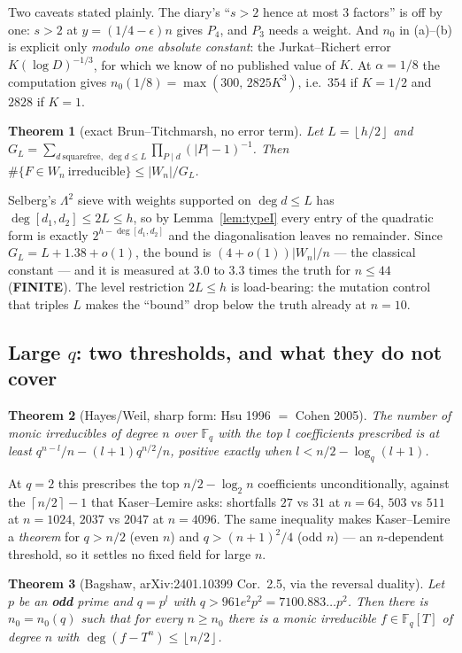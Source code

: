 \documentclass[10pt]{article}
\theoremstyle{plain}
\newtheorem{theorem}{Theorem}[section]
\theoremstyle{definition}
\newcommand{\F}{\mathbb F}
\newcommand{\ceil}[1]{\left\lceil #1\right\rceil}
\newcommand{\flr}[1]{\left\lfloor #1\right\rfloor}
\newcommand{\finite}{\textcolor{finite}{\textsf{\textbf{\footnotesize FINITE}}}}
\begin{document}
Two caveats stated plainly. The diary's ``$s>2$ hence at most $3$ factors'' is
off by one: $s>2$ at $y=(1/4-\epsilon)n$ gives $P_4$, and $P_3$ needs a weight.
And $n_0$ in (a)--(b) is explicit only \emph{modulo one absolute constant}: the
Jurkat--Richert error $K(\log D)^{-1/3}$, for which we know of no published
value of $K$. At $\alpha=1/8$ the computation gives
$n_0(1/8)=\max(300,\,2825K^3)$, i.e.\ $354$ if $K=1/2$ and $2828$ if $K=1$.

\begin{theorem}[exact Brun--Titchmarsh, no error term]\label{thm:BT}
Let $L=\flr{h/2}$ and
$G_L=\sum_{d\ \mathrm{squarefree},\ \deg d\le L}\prod_{P\mid d}(|P|-1)^{-1}$.
Then $\#\{F\in W_n\ \mathrm{irreducible}\}\le|W_n|/G_L$.
\end{theorem}

Selberg's $\Lambda^2$ sieve with weights supported on $\deg d\le L$ has
$\deg[d_1,d_2]\le2L\le h$, so by Lemma~\ref{lem:typeI} every entry of the
quadratic form is exactly $2^{h-\deg[d_1,d_2]}$ and the diagonalisation
leaves no remainder. Since $G_L=L+1.38+o(1)$, the bound is
$(4+o(1))|W_n|/n$ --- the classical constant --- and it is measured at
$3.0$ to $3.3$ times the truth for $n\le44$ (\finite). The level restriction
$2L\le h$ is load-bearing: the mutation control that triples $L$ makes the
``bound'' drop below the truth already at $n=10$.

\subsection{Large \texorpdfstring{$q$}{q}: two thresholds, and what they do not cover}

\begin{theorem}[Hayes/Weil, sharp form: Hsu 1996 $=$ Cohen 2005]\label{thm:hsu}
The number of monic irreducibles of degree $n$ over $\F_q$ with the top $l$
coefficients prescribed is at least $q^{n-l}/n-(l+1)q^{n/2}/n$, positive
exactly when $l<n/2-\log_q(l+1)$.
\end{theorem}

At $q=2$ this prescribes the top $n/2-\log_2 n$ coefficients unconditionally,
against the $\ceil{n/2}-1$ that Kaser--Lemire asks: shortfalls $27$ vs $31$ at
$n=64$, $503$ vs $511$ at $n=1024$, $2037$ vs $2047$ at $n=4096$. The same
inequality makes Kaser--Lemire a \emph{theorem} for $q>n/2$ (even $n$) and
$q>(n+1)^2/4$ (odd $n$) --- an $n$-dependent threshold, so it settles no fixed
field for large $n$.

\begin{theorem}[Bagshaw, arXiv:2401.10399 Cor.~2.5, via the reversal
duality]\label{thm:bagshaw}
Let $p$ be an \textbf{odd} prime and $q=p^{l}$ with $q>961e^2p^2=7100.883\dots p^2$.
Then there is $n_0=n_0(q)$ such that for every $n\ge n_0$ there is a monic
irreducible $f\in\F_q[T]$ of degree $n$ with $\deg(f-T^n)\le\flr{n/2}$.
\end{theorem}
\end{document}
